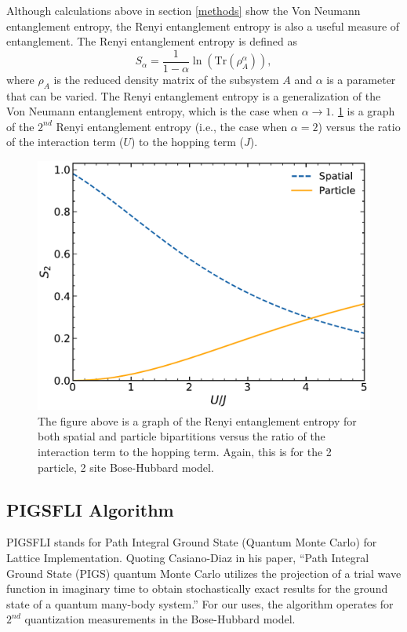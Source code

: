 Although calculations above in section \ref{methods} show the Von Neumann entanglement entropy, the Renyi entanglement entropy is also a useful measure of entanglement. The Renyi entanglement entropy is defined as 
\begin{equation}
S_{\alpha} = \frac{1}{1-\alpha} \ln{\left( \text{Tr} \left( \rho_A^{\alpha} \right) \right)},
\end{equation}
where $\rho_A$ is the reduced density matrix of the subsystem $A$ and $\alpha$ is a parameter that can be varied. The Renyi entanglement entropy is a generalization of the Von Neumann entanglement entropy, which is the case when $\alpha \rightarrow 1$.\cite{wang_entanglement_2016} \cref*{fig:ed_renyi} is a graph of the $2^{nd}$ Renyi entanglement entropy (i.e., the case when $\alpha = 2$) versus the ratio of the interaction term ($U$) to the hopping term ($J$).

\begin{figure}[H]
\centering
\includegraphics[scale=0.5]{../figures/ed_renyi.pdf}
\caption{The figure above is a graph of the Renyi entanglement entropy for both spatial and particle bipartitions versus the ratio of the interaction term to the hopping term. Again, this is for the 2 particle, 2 site Bose-Hubbard model.}
\label{fig:ed_renyi}
\end{figure}

\subsection{PIGSFLI Algorithm} \label{PIGSFLI}
PIGSFLI stands for Path Integral Ground State (Quantum Monte Carlo) for Lattice Implementation. Quoting Casiano-Diaz in his paper, ``Path Integral Ground State (PIGS) quantum Monte Carlo utilizes the projection of a trial wave function in imaginary time to obtain stochastically exact results for the ground state of a quantum many-body system.''\cite{emanuel_pigsfli_2022} For our uses, the algorithm operates for $2^{nd}$ quantization measurements in the Bose-Hubbard model.


